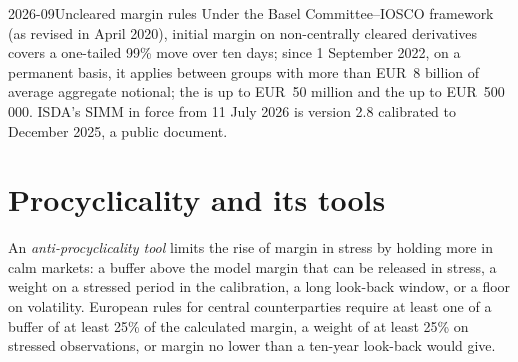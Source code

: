 \begin{omfigure}

\label{fig:rc:margin-models:approaches}
\end{omfigure}

\begin{dated}{2026-09}{Uncleared margin rules}\label{dat:rc:margin-models:umr}
Under the Basel Committee--IOSCO framework (as revised in April 2020), initial margin on
non-centrally cleared derivatives covers a one-tailed 99\% move over ten days; since 1 September 2022,
on a permanent basis, it applies between groups with more than EUR~8 billion of average aggregate
notional; the  is up to EUR~50 million and the  up to
EUR~500\,000. ISDA's SIMM in force from 11 July 2026 is version 2.8 calibrated to December 2025, a
public document.
\end{dated}

\section{Procyclicality and its tools}

\begin{definition}\label{def:rc:margin-models:apc}
An \emph{anti-procyclicality tool} limits the rise of margin in stress
by holding more in calm markets: a buffer above the model margin that can be released in stress, a
weight on a stressed period in the calibration, a long look-back window, or a floor on volatility.
European rules for central counterparties require at least one of a buffer of at least 25\% of the
calculated margin, a weight of at least 25\% on stressed observations, or margin no lower than a
ten-year look-back would give.
\end{definition}

